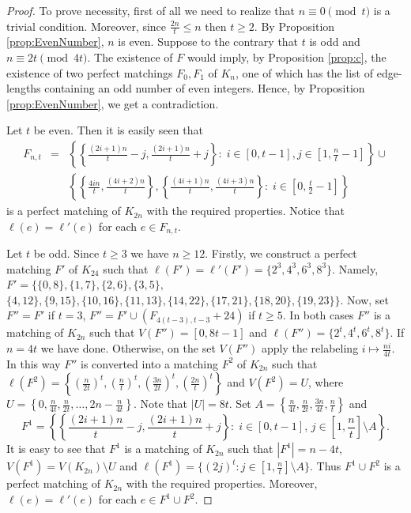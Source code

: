 \documentclass{amsart}
\theoremstyle{definition}
\numberwithin{equation}{section}
\begin{document}
\begin{proof}
To prove necessity, first of all we need to realize that $n\equiv 0 \pmod t$ is a trivial condition.
Moreover, since $\frac{2n}{t}\leq n$ then $t\geq 2$.
By Proposition \ref{prop:EvenNumber}, $n$ is even. Suppose to the contrary that
$t$ is odd and $n\equiv 2t \pmod {4t}$. The existence of $F$ would imply, by Proposition \ref{prop:c},
 the existence of two perfect matchings $F_0,F_1$
of $K_{n}$, one of which has the list of edge-lengths containing an odd number of even integers.
Hence, by Proposition \ref{prop:EvenNumber}, we get a contradiction.

Let $t$ be even. Then it is easily seen that
$$\begin{array}{rcl}
F_{n,t} & =& \left\{\left\{\frac{(2i+1)n}{t}-j,\frac{(2i+1)n}{t}+j \right\}:\; i\in [0,t-1], j\in \left[1,\frac{n}{t}-1\right]\right\}\cup\\[4pt]
&& \left\{\left\{\frac{4in}{t},\frac{(4i+2)n}{t}\right\},\left\{\frac{(4i+1)n}{t},\frac{(4i+3)n}{t}\right\}:\; i\in \left[0,\frac{t}{2}-1\right]\right\}
  \end{array}$$
is a perfect matching of $K_{2n}$ with the required properties. Notice that $\ell(e)=\ell'(e)$ for each $e\in F_{n,t}$.

Let $t$ be odd. Since $t\geq 3$ we have $n\geq 12$. Firstly, we construct a perfect matching $F'$ of $K_{24}$
such that $\ell(F')=\ell'(F')=\{2^3,4^3,6^3,8^3\}$.
Namely,
$F'=\{\{0,8\},\{1,7\},\{2,6\},\{3,5\},$ $\{4,12\},\{9,15\},\{10,16\},\{11,13\},\{14,22\},\{17,21\},\{18,20\},\{19,23\}\}$.
Now, set $F''=F'$ if $t=3$,
$F''=F'\cup (F_{4(t-3),t-3}+24)$ if $t\geq 5$. In both cases $F''$ is a  matching of $K_{2n}$
such that $V(F'')=[0,8t-1]$ and  $\ell(F'')=\{2^t,4^t,6^t,8^t\}$.
If $n=4t$ we have done. Otherwise,
on the set $V(F'')$ apply the relabeling $i\mapsto \frac{ni}{4t}$.
In this way $F''$ is converted into a matching $F^2$ of $K_{2n}$ such that
$\ell(F^2)=\left\{(\frac{n}{2t})^t,(\frac{n}{t})^t,(\frac{3n}{2t})^t,(\frac{2n}{t})^t\right\}$ and
$V(F^2)=U$,
where $U=\left\{0,\frac{n}{4t},\frac{n}{2t},\ldots,2n-\frac{n}{4t}\right\}$. Note that
 $|U|=8t$. Set $A=\left\{\frac{n}{4t},\frac{n}{2t},\frac{3n}{4t},\frac{n}{t}\right\}$
and
$$F^1=\left\{\left\{\frac{(2i+1)n}{t}-j,\frac{(2i+1)n}{t}+j\right\}:\; i\in [0,t-1],\, j\in \left[1,\frac{n}{t}\right]\setminus A\right\}.$$
It is easy to see that $F^1$ is a matching of $K_{2n}$ such that $|F^1|=n-4t$, $V(F^1)=V(K_{2n})\setminus U$ and
$\ell(F^1)=\{(2j)^t : j \in\left[1,\frac{n}{t}\right]\setminus A\}$.  
Thus $F^1\cup F^2$ is a perfect matching of $K_{2n}$ with the required properties. Moreover,
$\ell(e)=\ell'(e)$ for each $e\in F^1\cup F^2$.
\end{proof}
\end{document}
